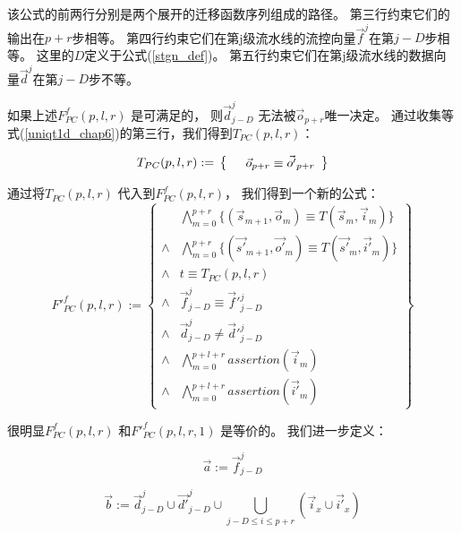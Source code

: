 该公式的前两行分别是两个展开的迁移函数序列组成的路径。
第三行约束它们的输出在$p+r$步相等。
第四行约束它们在第j级流水线的流控向量$\vec{f}^j$在第$j-D$步相等。
这里的$D$定义于公式(\ref{stgn_def})。
第五行约束它们在第j级流水线的数据向量$\vec{d}^j$在第$j-D$步不等。

如果上述$F^f_{PC}(p,l,r)$ 是可满足的，
则$\vec{d}^j_{j-D}$ 无法被$\vec{o}_{p+r}$唯一决定。
通过收集等式(\ref{uniqt1d_chap6})的第三行，我们得到$T_{PC}(p,l,r)$：

\begin{equation}\label{tpc_chap6}
T_{PC}(p,l,r):=\\
\left\{
\begin{array}{cc}
      &\vec{o}_{p+r}\equiv \vec{o'}_{p+r} \\
\end{array}
\right\}
\end{equation}

通过将$T_{PC}(p,l,r)$ 代入到$F^f_{PC}(p,l,r)$，
我们得到一个新的公式：
\begin{equation}\label{fpcq_chap6}
F'^f_{PC}(p,l,r):=
\left\{
\begin{array}{cc}
&\bigwedge_{m=0}^{p+r}
\{
(\vec{s}_{m+1},\vec{o}_m)\equiv T(\vec{s}_m,\vec{i}_m)
\}
\\
\wedge&\bigwedge_{m=0}^{p+r}
\{
(\vec{s'}_{m+1},\vec{o'}_m)\equiv T(\vec{s'}_m,\vec{i'}_m)
\}
\\
\wedge& t\equiv T_{PC}(p,l,r)\\
\wedge& \vec{f}^j_{j-D}\equiv \vec{f}'^j_{j-D} \\
\wedge& \vec{d}^j_{j-D}\ne \vec{d}'^j_{j-D} \\
\wedge&\bigwedge_{m=0}^{p+l+r}assertion(\vec{i}_m) \\
\wedge&\bigwedge_{m=0}^{p+l+r}assertion(\vec{i'}_m)
\end{array}
\right\}
\end{equation}


很明显$F^f_{PC}(p,l,r)$ 和$F'^f_{PC}(p,l,r,1)$ 是等价的。
我们进一步定义：

\begin{equation}\label{pcdef1_chap6}
\vec{a}:=\vec{f}^j_{j-D}
\end{equation}

\begin{equation}\label{pcdef2_chap6}
\vec{b}:=\vec{d}^j_{j-D}\cup \vec{d'}^j_{j-D}\cup \bigcup_{j-D\le i\le p+r}(\vec{i}_{x}\cup\vec{i'}_{x})
\end{equation}

